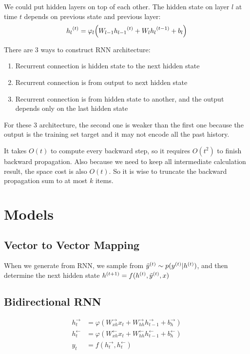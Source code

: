 We could put hidden layers on top of each other. The hidden state on layer $l$ at time $t$ depends on previous state and previous layer:
\begin{equation}
    \selectonesample{h_l}{t} = \varphi_l \mleft(W_{l-1} \selectonesample{h_{l-1}}{t} + W_l \selectonesample{h_l}{t-1} + b_l \mright)
\end{equation}



There are 3 ways to construct RNN architecture:
\begin{enumerate}
    \item Recurrent connection is hidden state to the next hidden state
    \item Recurrent connection is from output to next hidden state
    \item Recurrent connection is from hidden state to another, and the output depends only on the last hidden state
\end{enumerate}

For these 3 architecture, the second one is weaker than the first one because the output is the training set target and it may not encode all the past history. 


It takes $O(t)$ to compute every backward step, so it requires $O(t^2)$ to finish backward propagation. Also because we need to keep all intermediate calculation result, the space cost is also $O(t)$. So it is wise to truncate the backward propagation sum to at most $k$ items.




\section{Models}

\subsection{Vector to Vector Mapping}
When we generate from RNN, we sample from ${\tilde{y}}^{(t)} \sim p({y}^{(t)}|{h}^{(t)})$, and then determine the next hidden state ${h}^{(t+1)} = f({h}^{(t)}, {\tilde{y}}^{(t)}, x)$    


\subsection{Bidirectional RNN}

\begin{equation}
    \begin{aligned}
        h_t^{\rightarrow} &= \varphi(W_{xh}^{\rightarrow} x_t + W_{hh}^{\rightarrow} h_{t-1}^{\rightarrow} + b_h^{\rightarrow}) \\
        h_t^{\leftarrow} &= \varphi(W_{xh}^{\leftarrow} x_t + W_{hh}^{\leftarrow} h_{t-1}^{\leftarrow} + b_h^{\leftarrow})    \\
        y_t &= f(h_t^{\rightarrow}, h_t^{\leftarrow})
    \end{aligned}
\end{equation}


